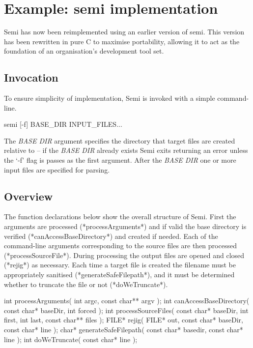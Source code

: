 \documentclass[]{article}
\begin{document}
\section{	Example: semi implementation}

Semi has now been reimplemented using an earlier version of semi.
This version has been rewritten in pure C to maximise portability, allowing it to act as the foundation of an organisation's development tool set.

\subsection{		Invocation}

To ensure simplicity of implementation, Semi is invoked with a simple command-line.

\begin{verbatimtab}
	semi [-f] BASE_DIR INPUT_FILES...

\end{verbatimtab}

The \emph{BASE DIR} argument specifies the directory that target files are created relative to -- if the \emph{BASE DIR} already exists Semi exits returning an error unless the `-f' flag is passes as the first argument.
After the \emph{BASE DIR} one or more input files are specified for parsing.

\subsection{		Overview}

The function declarations below show the overall structure of Semi.
First the arguments are processed (*processArguments*) and if valid the base directory is verified (*canAccessBaseDirectory*) and created if needed.
Each of the command-line arguments corresponding to the source files are then processed (*processSourceFile*).
During processing the output files are opened and closed (*rejig*) as necessary.
Each time a target file is created the filename must be appropriately sanitised (*generateSafeFilepath*), and it must be determined whether to truncate the file or not (*doWeTruncate*).

\begin{verbatimtab}
int        processArguments( int argc, const char** argv );
int  canAccessBaseDirectory( const char* baseDir, int forced );
int      processSourceFiles( const char* baseDir, int first, int last, const char** files );
FILE*                 rejig( FILE* out, const char* baseDir, const char* line );
char*  generateSafeFilepath( const char* basedir, const char* line );
int            doWeTruncate( const char* line );

\end{verbatimtab}
\end{document}
